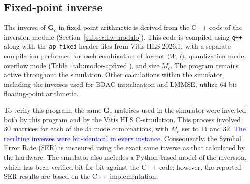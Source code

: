 \subsection{\texorpdfstring{Fixed-point inverse}{Fixed-point inverse}}\label{subsubsec:simul-inversa}
The inverse of $\mathbf{G}_c$ in fixed-point arithmetic is derived from the C++ code of the inversion module (Section~\ref{subsec:hw-modulo}). This code is compiled using \texttt{g++} along with the \texttt{ap\_fixed} header files from Vitis HLS 2026.1, with a separate compilation performed for each combination of format $\langle W, I\rangle$, quantization mode, overflow mode (Table~\ref{tab:modos-apfixed}), and size $M_c$. The program remains active throughout the simulation. Other calculations within the simulator, including the inverses used for BDAC initialization and LMMSE, utilize 64-bit floating-point arithmetic.

To verify this program, the same $\mathbf{G}_c$ matrices used in the simulator were inverted both by this program and by the Vitis HLS C-simulation. This process involved 30 matrices for each of the 35 mode combinations, with $M_c$ set to 16 and 32. \textcolor{blue}{The resulting inverses were bit-identical in every instance.} Consequently, the Symbol Error Rate (SER) is measured using the exact same inverse as that calculated by the hardware. The simulator also includes a Python-based model of the inversion, which has been verified bit-for-bit against the C++ code; however, the reported SER results are based on the C++ implementation.


